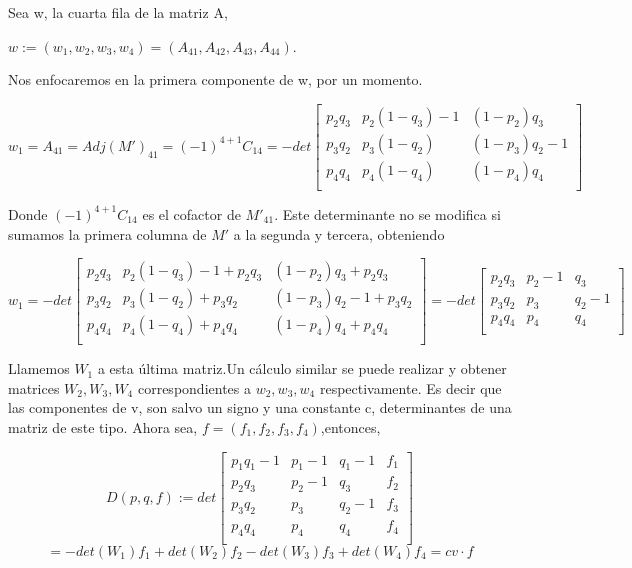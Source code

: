 \documentclass[12pt]{article}
\begin{document}
Sea w, la cuarta fila de la matriz A, 
\begin{center}
$w:=(w_1,w_2,w_3,w_4)=(A_{41},A_{42},A_{43},A_{44})$.
\end{center}
Nos enfocaremos en la primera componente de w, por un momento.
\begin{center}
 $$
 w_1=A_{41}=Adj(M')_{41}=(-1)^{4+1} C_{14}=- det
 \begin{bmatrix}
 p_2 q_3 & p_2(1-q_3)-1 &(1-p_2)q_3 \\
 p_3 q_2 & p_3(1-q_2) &(1-p_3)q_2 -1 \\ 
 p_4 q_4 & p_4(1-q_4) &(1-p_4)q_4 \\ 
 \end{bmatrix}
 $$
 \end{center}
 Donde $(-1)^{4+1} C_{14}$ es el cofactor de $M'_{41}$. Este determinante no se modifica si sumamos la 
 primera columna de $M'$ a la segunda y tercera, obteniendo
 \begin{center}
 $$w_1=- det
 \begin{bmatrix}
 p_2q_3 & p_2(1-q_3)-1+p_2q_3 &(1-p_2)q_3+p_2q_3 \\
 p_3q_2 & p_3(1-q_2)+p_3q_2 &(1-p_3)q_2 -1+p_3q_2 \\ 
 p_4q_4 & p_4(1-q_4)+p_4q_4 &(1-p_4)q_4+p_4q_4 \\ 
 \end{bmatrix}
 =- det
 \begin{bmatrix}
 p_2q_3 & p_2-1 & q_3 \\
 p_3q_2 & p_3 & q_2-1 \\ 
 p_4q_4 & p_4 & q_4 \\ 
 \end{bmatrix} 
 $$
\end{center} 
Llamemos $W_1$ a esta última matriz.Un cálculo similar se puede realizar y obtener matrices $W_2,W_3,W_4$ 
correspondientes a $w_2,w_3,w_4$ respectivamente. Es decir que las componentes de v, son salvo un signo y una constante c, 
determinantes de una matriz de este tipo.
Ahora sea, $f=(f_1,f_2,f_3,f_4)$,entonces,
\begin{center}
$$
D(p,q,f):=det
\begin{bmatrix}
 p_1q_1-1 & p_1-1 & q_1-1 & f_1 \\
 p_2q_3 & p_2-1 & q_3 & f_2\\
 p_3q_2 & p_3 & q_2-1  & f_3\\ 
 p_4q_4 & p_4 & q_4 & f_4\\ 
 \end{bmatrix} 
 $$
 $$
 =-det(W_1)f_1 +det(W_2)f_2 -det(W_3)f_3 +det(W_4)f_4 
 = c v \cdot f
 $$
\end{center}
\end{document}
